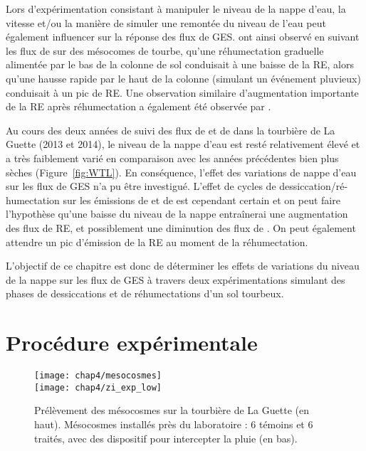 Lors d'expérimentation consistant à manipuler le niveau de la nappe d'eau, la vitesse et/ou la manière de simuler une remontée du niveau de l'eau peut également influencer sur la réponse des flux de GES.
\citet{strack2009} ont ainsi observé en suivant les flux de \coo sur des mésocomes de tourbe, qu'une réhumectation graduelle alimentée par le bas de la colonne de sol conduisait à une baisse de la RE, alors qu'une hausse rapide par le haut de la colonne (simulant un événement pluvieux) conduisait à un pic de RE.
Une observation similaire d'augmentation importante de la RE après réhumectation a également été observée par  \citet{mcneil2003}.


Au cours des deux années de suivi des flux de \coo et de \chh dans la tourbière de La Guette (2013 et 2014), le niveau de la nappe d'eau est resté relativement élevé et a très faiblement varié en comparaison avec les années précédentes bien plus sèches (Figure~\ref{fig:WTL}).
En conséquence, l'effet des variations de nappe d'eau sur les flux de GES n'a pu être investigué.
L'effet de cycles de dessiccation/ré-humectation sur les émissions de \coo et de \chh est cependant certain et on peut faire l'hypothèse qu'une baisse du niveau de la nappe entraînerai une augmentation des flux de RE, et possiblement une diminution des flux de \chh.
On peut également attendre un pic d'émission de la RE au moment de la réhumectation.

L'objectif de ce chapitre est donc de déterminer les effets de variations du niveau de la nappe sur les flux de GES à travers deux expérimentations simulant des phases de dessiccations et de réhumectations d'un sol tourbeux.

\section{Procédure expérimentale}

\begin{figure}
\centering
\texttt{[image: chap4/mesocosmes]}\\
\texttt{[image: chap4/zi\_exp\_low]}
\caption{Prélèvement des mésocosmes sur la tourbière de La Guette (en haut). Mésocosmes installés près du laboratoire : 6 témoins et 6 traités, avec des dispositif pour intercepter la pluie (en bas).}
\label{fig:mesophoto}
\end{figure}


